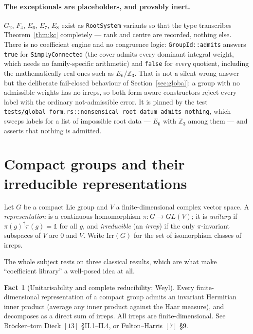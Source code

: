 \documentclass[11pt,a4paper]{article}
\theoremstyle{plain}
\theoremstyle{definition}
\newtheorem{fact}[theorem]{Fact}
\newcommand{\Irr}{\mathrm{Irr}}
\newcommand{\id}{\mathbb{1}}
\newcommand{\ZZ}{\mathbb{Z}}
\newcommand{\code}[1]{\texttt{#1}}
\begin{document}
\paragraph{The exceptionals are placeholders, and provably inert.}
$G_2$, $F_4$, $E_6$, $E_7$, $E_8$ exist as \code{RootSystem} variants so that
the type transcribes Theorem~\ref{thm:kc} completely --- rank and centre are
recorded, nothing else. There is no coefficient engine and no congruence
logic: \code{GroupId::admits} answers \code{true} for
\code{SimplyConnected} (the cover admits every dominant integral weight, which
needs no family-specific arithmetic) and \code{false} for \emph{every}
quotient, including the mathematically real ones such as $E_6/\ZZ_3$. That is
not a silent wrong answer but the deliberate fail-closed behaviour of
Section~\ref{sec:global}: a group with no admissible weights has no irreps, so
both form-aware constructors reject every label with the ordinary
not-admissible error. It is pinned by the test
\code{tests/global\_form.rs::nonsensical\_root\_datum\_admits\_nothing}, which
sweeps labels for a list of impossible root data --- $E_6$ with
$\ZZ_3$ among them --- and asserts that nothing is admitted.


\section{Compact groups and their irreducible representations}
\label{sec:compact}

Let $G$ be a compact Lie group and $V$ a finite-dimensional complex vector
space. A \emph{representation} is a continuous homomorphism
$\pi: G\to GL(V)$; it is \emph{unitary} if $\pi(g)^\dagger\pi(g)=\id$ for all
$g$, and \emph{irreducible} (an \emph{irrep}) if the only $\pi$-invariant
subspaces of $V$ are $0$ and $V$. Write $\Irr(G)$ for the set of isomorphism
classes of irreps.

The whole subject rests on three classical results, which are what make
``coefficient library'' a well-posed idea at all.

\begin{fact}[Unitarisability and complete reducibility; Weyl]
\label{fact:cr}
Every finite-dimensional representation of a compact group admits an invariant
Hermitian inner product (average any inner product against the Haar measure),
and decomposes as a direct sum of irreps. All irreps are
finite-dimensional. See Br\"ocker--tom Dieck $[13]$ \S II.1--II.4, or
Fulton--Harris $[7]$ \S9.
\end{fact}
\end{document}
